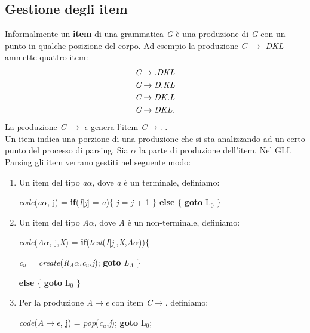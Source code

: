 \subsection{Gestione degli item}
Informalmente un \textbf{item} \cite{libro: compilatori} di una grammatica \textit{G} è una produzione di \textit{G} con un punto in qualche posizione del corpo. Ad esempio la produzione \textit{C} $\to$ \textit{DKL} ammette quattro item:
\begin{align}
	\textit{C} & \to \textit{.DKL} \notag \\
	\textit{C} & \to \textit{D.KL} \notag \\
	\textit{C} & \to \textit{DK.L} \notag \\
	\textit{C} & \to \textit{DKL.} \notag 
\end{align}
La produzione \textit{C} $\to$ $\epsilon$ genera l'item \textit{C}$\to$. .\\
Un item indica una porzione di una produzione che si sta analizzando ad un certo punto del processo di parsing. Sia $\alpha$ la parte di produzione dell'item. Nel GLL Parsing gli item verrano gestiti nel seguente modo: 
\begin{enumerate}
	\item Un item del tipo \textit{a}$\alpha$, dove \textit{a} è un terminale, definiamo:\par
	\textit{code}(\textit{a}$\alpha$, j) = \textbf{if}(\textit{I}[\textit{j}] = \textit{a})$\{$ \textit{j} = \textit{j} + 1 $\}$ \textbf{else} $\{$ \textbf{goto} L$_0$ $\}$
	\item Un item del tipo \textit{A}$\alpha$, dove \textit{A} è un non-terminale, definiamo:\par
	\textit{code}(\textit{A}$\alpha$, j,\textit{X}) = \textbf{if}(\textit{test}(\textit{I}[\textit{j}],\textit{X},\textit{A}$\alpha$))$\{$ \par 
	\hspace{4cm}\textit{c}$_u$ = \textit{create}(\textit{R}$_A\alpha$,\textit{c}$_u$,\textit{j}); \textbf{goto} \textit{L}$_A$ $\}$ \par 
	\hspace{3cm}\textbf{else} $\{$ \textbf{goto} L$_0$ $\}$
	\item Per la produzione \textit{A}$\to$$\epsilon$ con item \textit{C}$\to$. definiamo: \par
	\hspace{1cm}\textit{code}(\textit{A}$\to$$\epsilon$, j) = \textit{pop}(\textit{c}$_u$,\textit{j}); \textbf{goto} L$_0$;
\end{enumerate}
